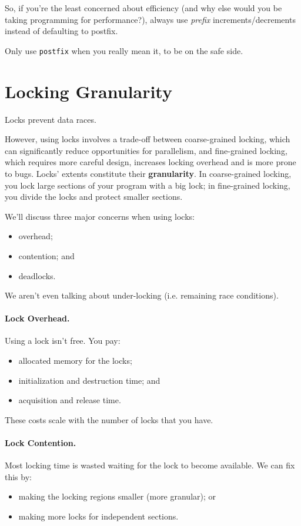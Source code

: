 \documentclass[11pt]{article}
\newenvironment{itemizep}{
 \begin{itemize}
  \setlength{\itemsep}{0pt}
  \setlength{\parsep}{3pt}
  \setlength{\topsep}{3pt}
  \setlength{\partopsep}{0pt}
  \setlength{\leftmargin}{1.5em}
  \setlength{\labelwidth}{1em}
  \setlength{\labelsep}{0.5em} }
 {\end{itemize}}
\begin{document}
So, if you're the least concerned about efficiency (and why else would you be
taking programming for performance?), always use
  \emph{prefix} increments/decrements instead of defaulting to postfix.

Only use {\tt postfix} when you really mean it, to be on the safe side.

\section*{Locking Granularity}

Locks prevent data races.

However, using locks involves a trade-off between coarse-grained
locking, which can significantly reduce opportunities for parallelism,
and fine-grained locking, which requires more careful design,
increases locking overhead and is more prone to bugs.  Locks' extents
constitute their {\bf granularity}. In coarse-grained locking, you
lock large sections of your program with a big lock; in fine-grained
locking, you divide the locks and protect smaller sections.

We'll discuss three major concerns when using locks:
  \begin{itemizep}
    \item overhead;
    \item contention; and
    \item deadlocks.
  \end{itemizep}
We aren't even talking about under-locking (i.e. remaining race conditions).

\paragraph{Lock Overhead.}
  Using a lock isn't free. You pay:
  \begin{itemizep}
    \item allocated memory for the locks;
    \item initialization and destruction time; and
    \item acquisition and release time.
  \end{itemizep}
  These costs scale with the number of locks that you have.

\paragraph{Lock Contention.}
 Most locking time is wasted waiting for the lock to become available.
We can fix this by:
      \begin{itemizep}
        \item making the locking regions smaller (more granular); or
        \item making more locks for independent sections.
      \end{itemizep}
\end{document}
